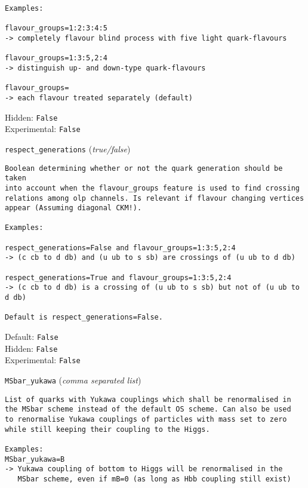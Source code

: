 \begin{basedescript}{\desclabelstyle{\pushlabel}}
\begin{verbatim}
Examples:

flavour_groups=1:2:3:4:5
-> completely flavour blind process with five light quark-flavours

flavour_groups=1:3:5,2:4
-> distinguish up- and down-type quark-flavours

flavour_groups=
-> each flavour treated separately (default)
\end{verbatim}
Hidden: \verb|False|
\\Experimental: \verb|False|
\\\item[\colorbox{gray!30}{\texttt{respect\_generations}}] (\textit{true/false})
\begin{verbatim}
Boolean determining whether or not the quark generation should be taken
into account when the flavour_groups feature is used to find crossing
relations among olp channels. Is relevant if flavour changing vertices
appear (Assuming diagonal CKM!).

Examples:

respect_generations=False and flavour_groups=1:3:5,2:4
-> (c cb to d db) and (u ub to s sb) are crossings of (u ub to d db)

respect_generations=True and flavour_groups=1:3:5,2:4
-> (c cb to d db) is a crossing of (u ub to s sb) but not of (u ub to d db)

Default is respect_generations=False.
\end{verbatim}
Default: \verb|False|
\\Hidden: \verb|False|
\\Experimental: \verb|False|
\\\item[\colorbox{gray!30}{\texttt{MSbar\_yukawa}}] (\textit{comma separated list})
\begin{verbatim}
List of quarks with Yukawa couplings which shall be renormalised in
the MSbar scheme instead of the default OS scheme. Can also be used
to renormalise Yukawa couplings of particles with mass set to zero
while still keeping their coupling to the Higgs.

Examples:
MSbar_yukawa=B
-> Yukawa coupling of bottom to Higgs will be renormalised in the
   MSbar scheme, even if mB=0 (as long as Hbb coupling still exist)


\end{verbatim}
\end{basedescript}
